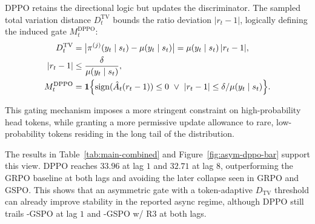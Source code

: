 DPPO retains the directional logic but updates the discriminator. The sampled total variation distance $D_t^{\mathrm{TV}}$ bounds the ratio deviation $|r_t-1|$, logically defining the induced gate $M_t^{\mathrm{DPPO}}$:
\begin{equation}
\begin{aligned}
D_t^{\mathrm{TV}} &=\bigl|\pi^{(j)}(y_t\mid s_t)-\mu(y_t\mid s_t)\bigr| =\mu(y_t\mid s_t)\,|r_t-1|, \\
|r_t-1| &\le \frac{\delta}{\mu(y_t\mid s_t)}, \\
M_t^{\mathrm{DPPO}} &=\mathbf 1\Bigl\{\operatorname{sign}(\hat A_t(r_t-1))\le 0\ \vee\ |r_t-1|\le\delta/\mu(y_t\mid s_t)\Bigr\}.
\end{aligned}
\label{eq:dppo_formulation}
\end{equation}

This gating mechanism imposes a more stringent constraint on high-probability head tokens, while granting a more permissive update allowance to rare, low-probability tokens residing in the long tail of the distribution.




 The results in Table~\ref{tab:main-combined} and Figure~\ref{fig:asym-dppo-bar} support this view. DPPO reaches $33.96$ at lag $1$ and $32.71$ at lag $8$, outperforming the GRPO baseline at both lags and avoiding the later collapse seen in GRPO and GSPO. This shows that an asymmetric gate with a token-adaptive $D_{\mathrm{TV}}$ threshold can already improve stability in the reported async regime, although DPPO still trails \satr-GSPO at lag $1$ and \satr-GSPO w/ R3 at both lags.


